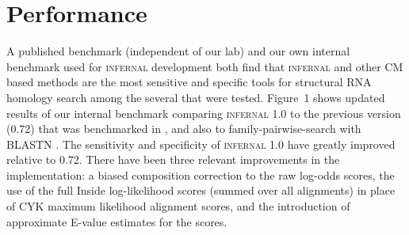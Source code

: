 
\section{Performance}


A published benchmark (independent of our lab) \citep{Freyhult07} and
our own internal benchmark used for \textsc{infernal} development
\citep{NawrockiEddy07} both find that \textsc{infernal} and other CM
based methods are the most sensitive and specific tools for structural
RNA homology search among the several that were tested. Figure~1 shows
updated results of our internal benchmark comparing \textsc{infernal}
1.0 to the previous version (0.72) that was benchmarked in
\citet{Freyhult07}, and also to family-pairwise-search with BLASTN
\citep{Altschul97,Grundy98b}.  The sensitivity and specificity of
\textsc{infernal} 1.0 have greatly improved relative to 0.72. There
have been three relevant improvements in the implementation: a biased
composition correction to the raw log-odds scores, the use of the full
Inside log-likelihood scores (summed over all alignments) in place of
CYK maximum likelihood alignment scores, and the introduction of
approximate E-value estimates for the scores.


